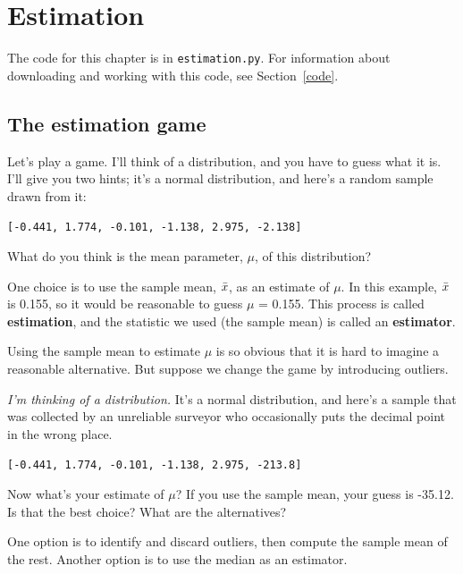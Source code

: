 \documentclass[12pt]{book}
\begin{document}
\chapter{Estimation}
\label{estimation}

The code for this chapter is in {\tt estimation.py}.  For information
about downloading and working with this code, see Section~\ref{code}.


\section{The estimation game}

Let's play a game.  I'll think of a distribution, and you have to guess
what it is.  I'll give you two hints; it's a
normal distribution, and here's a random sample drawn from it:

{\tt [-0.441, 1.774, -0.101, -1.138, 2.975, -2.138]}

What do you think is the mean parameter, $\mu$, of this distribution?

One choice is to use the sample mean, $\bar{x}$, as an estimate of $\mu$.
In this example, $\bar{x}$ is 0.155, so it would
be reasonable to guess $\mu$ = 0.155.
This process is called {\bf estimation}, and the statistic we used
(the sample mean) is called an {\bf estimator}.

Using the sample mean to estimate $\mu$ is so obvious that it is hard
to imagine a reasonable alternative.  But suppose we change the game by
introducing outliers.

{\em I'm thinking of a distribution.}  It's a normal distribution, and
here's a sample that was collected by an unreliable surveyor who
occasionally puts the decimal point in the wrong place.

{\tt [-0.441, 1.774, -0.101, -1.138, 2.975, -213.8]}

Now what's your estimate of $\mu$?  If you use the sample mean, your
guess is -35.12.  Is that the best choice?  What are the alternatives?

One option is to identify and discard outliers, then compute the sample
mean of the rest.  Another option is to use the median as an estimator.
\end{document}
